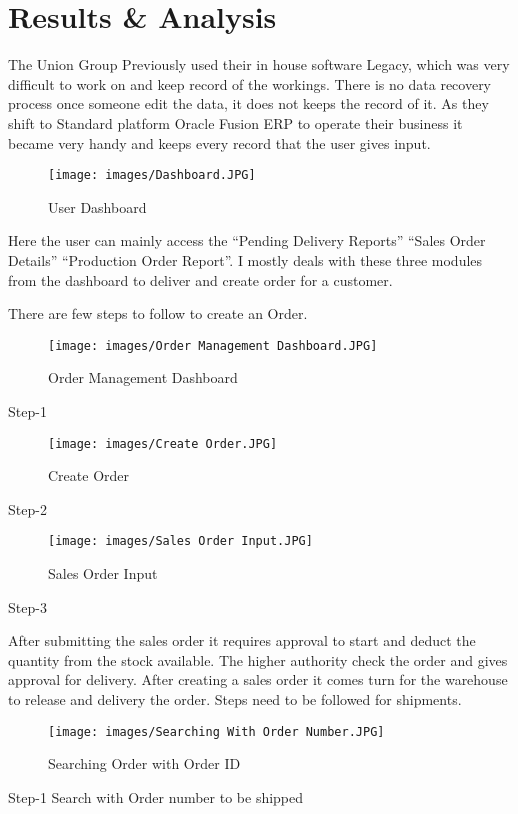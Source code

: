 \chapter{Results \& Analysis}

The Union Group Previously used their in house software Legacy, which was very difficult to work on and keep record of the workings. There is no data recovery process once someone edit the data, it does not keeps the record of it. As they shift to Standard platform Oracle Fusion ERP to operate their business it became very handy and keeps every record that the user gives input.
\begin{figure} [H]
    \centering
    \texttt{[image: images/Dashboard.JPG]}
    \caption{User Dashboard}
    \label{fig:my_label}
\end{figure}    


Here the user can mainly access the “Pending Delivery Reports” “Sales Order Details” “Production Order Report”.
I mostly deals with these three modules from the dashboard to deliver and create order for a customer.

There are few steps to follow to create an Order. 


\begin{figure} [H]
    \centering
    \texttt{[image: images/Order Management Dashboard.JPG]}
    \caption{Order Management Dashboard}
    \label{fig:my_label}
\end{figure}
    Step-1

\begin{figure} [H]
    \centering
    \texttt{[image: images/Create Order.JPG]}
    \caption{Create Order}
    \label{fig:my_label}
\end{figure}
Step-2

\begin{figure} [H]
    \centering
    \texttt{[image: images/Sales Order Input.JPG]}
    \caption{Sales Order Input}
    \label{fig:my_label}
\end{figure}
Step-3


After submitting the sales order it requires approval to start and deduct the quantity from the stock available. The higher authority check the order and gives approval for delivery.
After creating a sales order it comes turn for the warehouse to release and delivery the order.
Steps need to be followed for shipments.

\begin{figure} [H]
    \centering
    \texttt{[image: images/Searching With Order Number.JPG]}
    \caption{Searching Order with Order ID}
    \label{fig:my_label}
\end{figure}
Step-1
Search with Order number to be shipped

